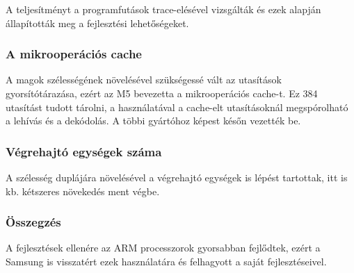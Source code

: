 A teljesítményt a programfutások trace-elésével vizsgálták és ezek alapján állapították meg a fejlesztési lehetőségeket.

\subsubsection{A mikrooperációs cache}
A magok szélességének növelésével szükségessé vált az utasítások gyorsítótárazása, ezért az M5 bevezetta a mikrooperációs cache-t.
Ez 384 utasítást tudott tárolni, a használatával a cache-elt utasításoknál megspórolható a lehívás és a dekódolás.
A többi gyártóhoz képest későn vezették be.

\subsubsection{Végrehajtó egységek száma}
A szélesség duplájára növelésével a végrehajtó egységek is lépést tartottak, itt is kb. kétszeres növekedés ment végbe.

\subsubsection{Összegzés}
A fejlesztések ellenére az ARM processzorok gyorsabban fejlődtek, ezért a Samsung is visszatért ezek használatára és felhagyott a saját fejlesztéseivel.

